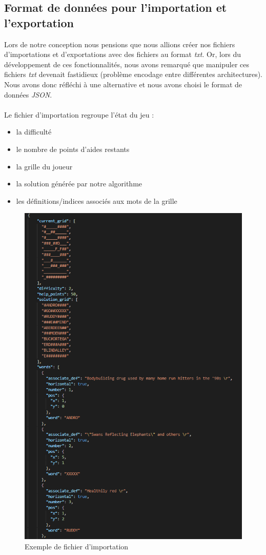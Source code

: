 \documentclass [ 11 pt ] {article}
\begin{document}
    \subsection{Format de données pour l'importation et l'exportation}
        Lors de notre conception nous pensions que nous allions créer nos fichiers d'importations et d'exportations avec des fichiers au format \textit{txt}. Or, lors du développement de ces fonctionnalités, nous avons remarqué que manipuler ces fichiers \textit{txt} devenait fastidieux (problème encodage entre différentes architectures). Nous avons donc réfléchi à une alternative et nous avons choisi le format de données \textit{JSON}.
        \\\\
        Le fichier d'importation regroupe l'état du jeu :
        \begin{itemize}
            \item la difficulté
            \item le nombre de points d'aides restants
            \item la grille du joueur
            \item la solution générée par notre algorithme
            \item les définitions/indices associés aux mots de la grille
        \end{itemize}
        
        \begin{figure}[H]
            \begin{center}
            \includegraphics[height=1\linewidth]{import_file.png}
            \caption{Exemple de fichier d'importation} 
            \end{center}
            \end{figure}
\end{document}

